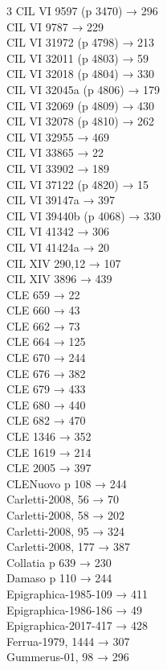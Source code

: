 \begin{multicols}{3}
CIL VI 9597 (p 3470) → 296\\
CIL VI 9787 → 229\\
CIL VI 31972 (p 4798) → 213\\
CIL VI 32011 (p 4803) → 59\\
CIL VI 32018 (p 4804) → 330\\
CIL VI 32045a (p 4806) → 179\\
CIL VI 32069 (p 4809) → 430\\
CIL VI 32078 (p 4810) → 262\\
CIL VI 32955 → 469\\
CIL VI 33865 → 22\\
CIL VI 33902 → 189\\
CIL VI 37122 (p 4820) → 15\\
CIL VI 39147a → 397\\
CIL VI 39440b (p 4068) → 330\\
CIL VI 41342 → 306\\
CIL VI 41424a → 20\\
CIL XIV 290,12 → 107\\
CIL XIV 3896 → 439\\
CLE 659 → 22\\
CLE 660 → 43\\
CLE 662 → 73\\
CLE 664 → 125\\
CLE 670 → 244\\
CLE 676 → 382\\
CLE 679 → 433\\
CLE 680 → 440\\
CLE 682 → 470\\
CLE 1346 → 352\\
CLE 1619 → 214\\
CLE 2005 → 397\\
CLENuovo p 108 → 244\\
Carletti-2008, 56 → 70\\
Carletti-2008, 58 → 202\\
Carletti-2008, 95 → 324\\
Carletti-2008, 177 → 387\\
Collatia p 639 → 230\\
Damaso p 110 → 244\\
Epigraphica-1985-109 → 411\\
Epigraphica-1986-186 → 49\\
Epigraphica-2017-417 → 428\\
Ferrua-1979, 1444 → 307\\
Gummerus-01, 98 → 296\\

\end{multicols}
